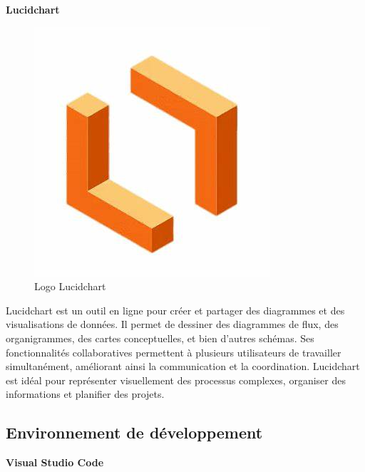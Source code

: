 \large 
\textbf{Lucidchart}
\begin{figure}[htbp]
   \centering
   \includegraphics[scale=0.2]{Images/lucid.jpeg} 
   \caption{Logo Lucidchart}
   \label{fig:lucid}
\end{figure}

Lucidchart est un outil en ligne pour créer et partager des diagrammes et des visualisations de données. Il permet de dessiner des diagrammes de flux, des organigrammes, des cartes conceptuelles, et bien d'autres schémas. Ses fonctionnalités collaboratives permettent à plusieurs utilisateurs de travailler simultanément, améliorant ainsi la communication et la coordination. Lucidchart est idéal pour représenter visuellement des processus complexes, organiser des informations et planifier des projets.

\subsection{Environnement de développement}
\large 
\textbf{Visual Studio Code}

